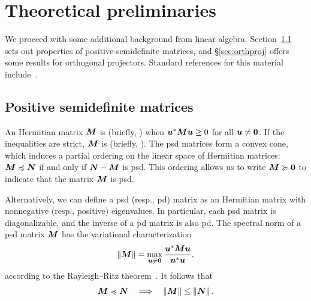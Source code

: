 \documentclass[final]{siamltex}
\newcommand{\pgnotate}[1]{{\color{blue}[#1]}}
\begin{document}
\section{Theoretical preliminaries} \label{sec:lin-alg-prelim}

We proceed with some additional background from linear algebra.
Section~\ref{sec:psd} sets out properties of positive-semidefinite
matrices, and \S\ref{sec:orthproj} offers some results
for orthogonal projectors.  Standard references for this material
include~\cite{Bha97:Matrix-Analysis,HJ85:Matrix-Analysis}.

\subsection{Positive semidefinite matrices} \label{sec:psd}

An Hermitian matrix $\bm{M}$ is 
(briefly, ) when $\bm{u}^* \bm{M} \bm{u} \geq 0$ for all
$\bm{u} \neq \bm{0}$.
If the inequalities are strict, $\bm{M}$ is  (briefly, ).
The psd matrices form a convex cone, which induces a partial ordering
on the linear space of Hermitian matrices:
$\bm{M} \preccurlyeq \bm{N}$ if and only if
$\bm{N} - \bm{M}$ is psd.
This ordering allows us to write $\bm{M} \succcurlyeq \bm{0}$ to
indicate that the matrix $\bm{M}$ is psd.

Alternatively, we can define a psd (resp., pd) matrix as an
Hermitian matrix with nonnegative (resp., positive) eigenvalues.
In particular, each psd matrix is diagonalizable, and the inverse
of a pd matrix is also pd.  The spectral norm of a psd matrix
$\bm{M}$ has the variational characterization
\begin{equation}
\label{eq:norm_psd}
\norm{\mtx{M}}
    = \max_{\vct{u} \neq \vct{0}} \frac{\vct{u}^\adj \mtx{M} \vct{u}}{\vct{u}^\adj \vct{u}},
\end{equation}
according to the Rayleigh--Ritz
theorem~\cite[Thm.~4.2.2]{HJ85:Matrix-Analysis}.  It follows that
\begin{equation}
\label{eq:psdle_norm}
\mtx{M} \psdle \mtx{N} \quad\Longrightarrow\quad \norm{\mtx{M}}
\leq \norm{\mtx{N}}.
\end{equation}
\end{document}

